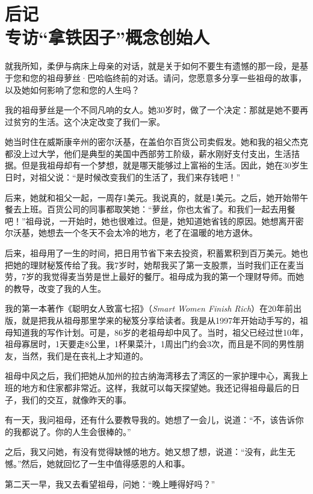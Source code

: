 \section[后记\q 专访“拿铁因子”概念创始人]{后记\\ 专访“拿铁因子”概念创始人}

{\heiti 就我所知，柔伊与病床上母亲的对话，就是关于如何不要生有遗憾的那一段，是基于您和您的祖母萝丝·巴哈临终前的对话。请问，您愿意多分享一些祖母的故事，以及她如何影响了您和您的人生吗？} \vspace{1em}

我的祖母萝丝是一个不同凡响的女人。她30岁时，做了一个决定：那就是她不要再过贫穷的生活。这个决定改变了我们一家。

她当时住在威斯康辛州的密尔沃基，在盖伯尔百货公司卖假发。她和我的祖父杰克都没上过大学，他们是典型的美国中西部劳工阶级，薪水刚好支付支出，生活拮据。但是我祖母却有一个梦想，就是哪天能够过上富裕的生活。因此，她在30岁生日时，对祖父说：“是时候改变我们的生活了，我们来存钱吧！”

后来，她就和祖父一起，一周存1美元。我说真的，就是1美元。之后，她开始带午餐去上班。百货公司的同事都取笑她：“萝丝，你也太省了。和我们一起去用餐吧！”祖母说，一开始时，她也很难过。但是，她知道她省钱的原因。她想离开密尔沃基，她想去一个冬天不会太冷的地方，老了在温暖的地方退休。

后来，祖母用了一生的时间，把日用节省下来去投资，积蓄累积到百万美元。她也把她的理财秘笈传给了我。我7岁时，她帮我买了第一支股票，当时我们正在麦当劳，7岁的我觉得麦当劳是世上最好的餐厅。祖母成为我的第一个理财导师。而她的教导，改变了我的人生。

我的第一本著作《聪明女人致富七招》（\textit{Smart Women Finish Rich}）在20年前出版，就是把我从祖母那里学来的秘笈分享给读者。我是从1997年开始动手写的，祖母知道我的写作计划。可是，86岁的老祖母却中风了。当时，祖父已经过世10年，祖母寡居时，1天要走8公里，1杯果菜汁，1周出门约会3次，而且是不同的男性朋友，当然，我们是在丧礼上才知道的。

祖母中风之后，我们把她从加州的拉古纳海湾移去了湾区的一家护理中心，离我上班的地方和住家都非常近。这样，我就可以每天探望她。我还记得祖母最后的日子，我们的交互，就像昨天的事。

有一天，我问祖母，还有什么要教导我的。她想了一会儿，说道：“不，该告诉你的我都说了。你的人生会很棒的。”

之后，我又问她，有没有觉得缺憾的地方。她又想了想，说道：“没有，此生无憾。”然后，她就回忆了一生中值得感恩的人和事。

第二天一早，我又去看望祖母，问她：“晚上睡得好吗？”


